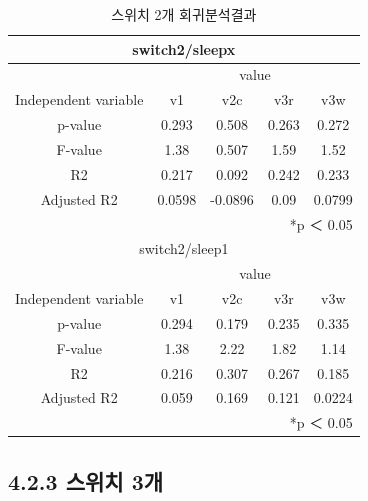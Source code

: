 \documentclass[11pt
  , a4paper
  , article
  , oneside
]{memoir}
\begin{document}
\begin{table}[h!]
\begin{center}
\begin{tabular}{c|c||c||c||c}\hline
\multicolumn{5}{c}{switch2/sleepx}\\ \hline\hline
\multicolumn{1}{c|}{}& \multicolumn{4}{c}{value}\\
\cline{1-5}
Independent variable & v1 & v2c & v3r & v3w      \\ \hline\hline
p-value & 0.293 & 0.508 & 0.263 & 0.272\\ 
F-value & 1.38 & 0.507 & 1.59 & 1.52\\ 
R2 & 0.217 & 0.092 & 0.242 & 0.233\\ 
Adjusted R2 & 0.0598 & -0.0896 & 0.09 & 0.0799\\ \hline\hline
\multicolumn{5}{r}{*p ＜ 0.05} \\ \hline \hline
\multicolumn{5}{c}{switch2/sleep1}\\ \hline\hline
\multicolumn{1}{c|}{}& \multicolumn{4}{c}{value}\\
\cline{1-5}
Independent variable & v1 & v2c & v3r & v3w      \\ \hline\hline
p-value &  0.294 &  0.179& 0.235  &  0.335\\ 
F-value &  1.38 &  2.22 &  1.82  &  1.14\\ 
R2 &  0.216 &  0.307&  0.267 & 0.185\\ 
Adjusted R2 & 0.059 & 0.169 & 0.121 & 0.0224\\ \hline
\multicolumn{5}{r}{*p ＜ 0.05} \\ \hline\hline
\end{tabular}
\caption{  스위치 2개 회귀분석결과 }
\end{center}
\end{table} 

\clearpage
\subsection{4.2.3 스위치 3개}
\end{document}
